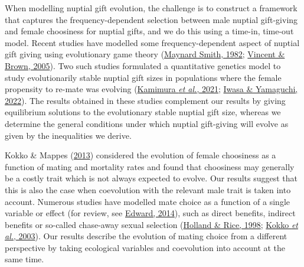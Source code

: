 \documentclass[
]{article}
\begin{document}
When modelling nuptial gift evolution, the challenge is to construct a
framework that captures the frequency-dependent selection between male
nuptial gift-giving and female choosiness for nuptial gifts, and we do
this using a time-in, time-out model. Recent studies have modelled some
frequency-dependent aspect of nuptial gift giving using evolutionary
game theory (\protect\hyperlink{ref-MaynardSmith1982}{Maynard Smith,
1982}; \protect\hyperlink{ref-Vincent2005}{Vincent \& Brown, 2005}). Two
such studies formulated a quantitative genetics model to study
evolutionarily stable nuptial gift sizes in populations where the female
propensity to re-mate was evolving
(\protect\hyperlink{ref-Kamimura2021}{Kamimura \emph{et al.}, 2021};
\protect\hyperlink{ref-Iwasa2022}{Iwasa \& Yamaguchi, 2022}). The
results obtained in these studies complement our results by giving
equilibrium solutions to the evolutionary stable nuptial gift size,
whereas we determine the general conditions under which nuptial
gift-giving will evolve as given by the inequalities we derive.

Kokko \& Mappes (\protect\hyperlink{ref-Kokko2013}{2013}) considered the
evolution of female choosiness as a function of mating and mortality
rates and found that choosiness may generally be a costly trait which is
not always expected to evolve. Our results suggest that this is also the
case when coevolution with the relevant male trait is taken into
account. Numerous studies have modelled mate choice as a function of a
single variable or effect (for review, see
\protect\hyperlink{ref-Edward2015}{Edward, 2014}), such as direct
benefits, indirect benefits or so-called chase-away sexual selection
(\protect\hyperlink{ref-Holland1998}{Holland \& Rice, 1998};
\protect\hyperlink{ref-Kokko2003}{Kokko \emph{et al.}, 2003}). Our
results describe the evolution of mating choice from a different
perspective by taking ecological variables and coevolution into account
at the same time.
\end{document}
